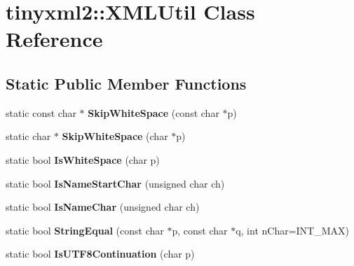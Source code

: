 \hypertarget{classtinyxml2_1_1_x_m_l_util}{}\section{tinyxml2\+:\+:X\+M\+L\+Util Class Reference}
\label{classtinyxml2_1_1_x_m_l_util}
\subsection*{Static Public Member Functions}
\begin{DoxyCompactItemize}
\item 
\hypertarget{classtinyxml2_1_1_x_m_l_util_a9333d20f2a34325b5115ca45849c4b2a}{}static const char $\ast$ {\bfseries Skip\+White\+Space} (const char $\ast$p)\label{classtinyxml2_1_1_x_m_l_util_a9333d20f2a34325b5115ca45849c4b2a}

\item 
\hypertarget{classtinyxml2_1_1_x_m_l_util_aa48025be8843ec5a79b65579d31bd8fc}{}static char $\ast$ {\bfseries Skip\+White\+Space} (char $\ast$p)\label{classtinyxml2_1_1_x_m_l_util_aa48025be8843ec5a79b65579d31bd8fc}

\item 
\hypertarget{classtinyxml2_1_1_x_m_l_util_a357ec3af8fc433d19023a815f45e8e33}{}static bool {\bfseries Is\+White\+Space} (char p)\label{classtinyxml2_1_1_x_m_l_util_a357ec3af8fc433d19023a815f45e8e33}

\item 
\hypertarget{classtinyxml2_1_1_x_m_l_util_abe106a69ac4d942a4381a4d9dfd0e0bd}{}static bool {\bfseries Is\+Name\+Start\+Char} (unsigned char ch)\label{classtinyxml2_1_1_x_m_l_util_abe106a69ac4d942a4381a4d9dfd0e0bd}

\item 
\hypertarget{classtinyxml2_1_1_x_m_l_util_a04b17341538fa11752f24b4301d19485}{}static bool {\bfseries Is\+Name\+Char} (unsigned char ch)\label{classtinyxml2_1_1_x_m_l_util_a04b17341538fa11752f24b4301d19485}

\item 
\hypertarget{classtinyxml2_1_1_x_m_l_util_acfcd287cacfd2533e1bc9ea4dfb56602}{}static bool {\bfseries String\+Equal} (const char $\ast$p, const char $\ast$q, int n\+Char=I\+N\+T\+\_\+\+M\+A\+X)\label{classtinyxml2_1_1_x_m_l_util_acfcd287cacfd2533e1bc9ea4dfb56602}

\item 
\hypertarget{classtinyxml2_1_1_x_m_l_util_ad7fd82e0fe610d73ef7bf9f359f104a3}{}static bool {\bfseries Is\+U\+T\+F8\+Continuation} (char p)\label{classtinyxml2_1_1_x_m_l_util_ad7fd82e0fe610d73ef7bf9f359f104a3}


\end{DoxyCompactItemize}
